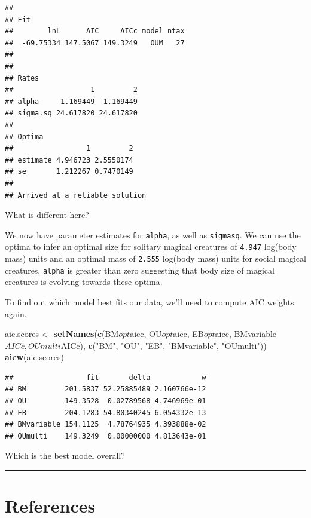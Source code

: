 \documentclass[]{book}
\newenvironment{Shaded}{\begin{snugshade}}{\end{snugshade}}
\newcommand{\KeywordTok}[1]{\textcolor[rgb]{0.13,0.29,0.53}{\textbf{{#1}}}}
\newcommand{\StringTok}[1]{\textcolor[rgb]{0.31,0.60,0.02}{{#1}}}
\newcommand{\NormalTok}[1]{{#1}}
\begin{document}
\begin{verbatim}
## 
## Fit
##        lnL      AIC     AICc model ntax
##  -69.75334 147.5067 149.3249   OUM   27
## 
## 
## Rates
##                  1         2
## alpha     1.169449  1.169449
## sigma.sq 24.617820 24.617820
## 
## Optima
##                 1         2
## estimate 4.946723 2.5550174
## se       1.212267 0.7470149
## 
## Arrived at a reliable solution
\end{verbatim}

What is different here?

We now have parameter estimates for \texttt{alpha}, as well as
\texttt{sigmasq}. We can use the optima to infer an optimal size for
solitary magical creatures of \texttt{4.947} log(body mass) units and an
optimal mass of \texttt{2.555} log(body mass) units for social magical
creatures. \texttt{alpha} is greater than zero suggesting that body size
of magical creatures is evolving towards these optima.

To find out which model best fits our data, we'll need to compute AIC
weights again.

\begin{Shaded}
\begin{Highlighting}[]
\NormalTok{aic.scores <-}\StringTok{ }\KeywordTok{setNames}\NormalTok{(}\KeywordTok{c}\NormalTok{(BM$opt$aicc, OU$opt$aicc, EB$opt$aicc, BMvariable$AICc, OUmulti$AICc), }
                       \KeywordTok{c}\NormalTok{(}\StringTok{"BM"}\NormalTok{, }\StringTok{"OU"}\NormalTok{, }\StringTok{"EB"}\NormalTok{, }\StringTok{"BMvariable"}\NormalTok{, }\StringTok{"OUmulti"}\NormalTok{))}
\KeywordTok{aicw}\NormalTok{(aic.scores)}
\end{Highlighting}
\end{Shaded}

\begin{verbatim}
##                 fit       delta            w
## BM         201.5837 52.25885489 2.160766e-12
## OU         149.3528  0.02789568 4.746969e-01
## EB         204.1283 54.80340245 6.054332e-13
## BMvariable 154.1125  4.78764935 4.393888e-02
## OUmulti    149.3249  0.00000000 4.813643e-01
\end{verbatim}

Which is the best model overall?

\begin{center}\rule{0.5\linewidth}{\linethickness}\end{center}

\section{References}\label{references-3}
\end{document}
